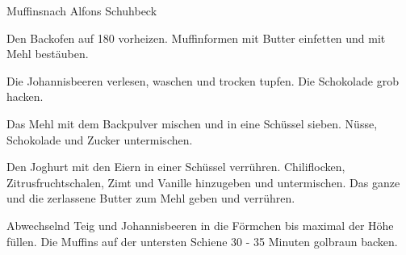 \begin{recipe}{Muffins}{nach Alfons Schuhbeck}
  \label{Muffins}
  \inglist

  \steps
  Den Backofen auf 180 \celsius vorheizen. Muffinformen mit Butter einfetten und mit Mehl bestäuben.

  Die Johannisbeeren verlesen, waschen und trocken tupfen. Die Schokolade grob hacken.

  Das Mehl mit dem Backpulver mischen und in eine Schüssel sieben. Nüsse, Schokolade und Zucker untermischen.

  Den Joghurt mit den Eiern in einer Schüssel verrühren. Chiliflocken, Zitrusfruchtschalen, Zimt und Vanille hinzugeben und untermischen. Das ganze und die zerlassene Butter zum Mehl geben und verrühren.

  Abwechselnd Teig und Johannisbeeren in die Förmchen bis maximal \dreiviertel der Höhe füllen. Die Muffins auf der untersten Schiene 30 - 35 Minuten golbraun backen.
\end{recipe}
